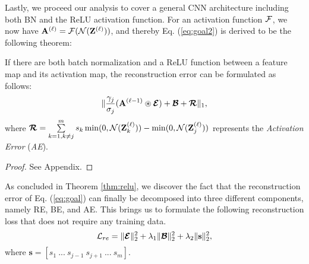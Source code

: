 

Lastly, we proceed our analysis to cover a general CNN architecture including both BN and the ReLU activation function. For an activation function $\mathcal{F}$, we now have $\mathbf{A}^{(\ell)} = \mathcal{F}(\mathcal{N}(\mathbf{Z}^{(\ell)}))$, and thereby Eq. (\ref{eq:goal2}) is derived to be the following theorem:
\begin{theorem} \label{thm:relu}
If there are both batch normalization and a ReLU function between a feature map and its activation map, the reconstruction error can be formulated as follows:
    \begin{equation} \label{eq:relu}
     \| \frac{\gamma_{j}}{\sigma_{j}}{(\mathbf{A}^{(\ell-1)}\circledast\boldsymbol{\mathcal{E}})}+ \boldsymbol{\mathcal{B}} + \boldsymbol{\mathcal{R}}\|_{1},
     \nonumber
     \end{equation}
     where $\boldsymbol{\mathcal{R}} = \sum\limits_{k=1, k \neq j}^{m} s_{k}  \min(0,\mathcal{N}(\mathbf{Z}_{k}^{(\ell)}))-\min(0,\mathcal{N}(\mathbf{Z}_{j}^{(\ell)}))$ represents the \textit{Activation Error} (\textit{AE}).
\end{theorem}
\begin{proof}
See Appendix.
\end{proof}

As concluded in Theorem \ref{thm:relu}, we discover the fact that the reconstruction error of Eq. (\ref{eq:goal}) can finally be decomposed into three different components, namely RE, BE, and AE. This brings us to formulate the following reconstruction loss that does not require any training data. 
\begin{equation}
     \mathcal{L}_{re} =  \|\boldsymbol{\mathcal{E}}\|_2^{2} + \lambda_1 \|\boldsymbol{\mathcal{B}}\|_2^{2} + \lambda_2 \|\mathbf{s}\|_{2}^{2},
\label{eq:loss}
\end{equation}
where $\mathbf{s} =  [s_{1}~...~s_{j-1}~s_{j+1}~...~s_{m}]$.

